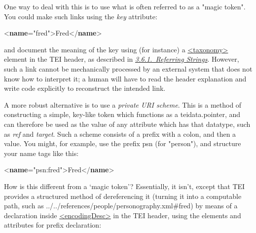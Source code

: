 One way to deal with this is to use what is often referred to as a "magic token". You could make such links using the {\itshape key} attribute: \par\bgroup{}\exampleFont \begin{shaded}\noindent\mbox{}{<\textbf{name}\hspace*{1em}{key}="{fred}">}Fred{</\textbf{name}>}\end{shaded}\egroup\par \noindent  and document the meaning of the key using (for instance) a \hyperref[TEI.taxonomy]{<taxonomy>} element in the TEI header, as described in \textit{\hyperref[CONARS]{3.6.1.\ Referring Strings}}. However, such a link cannot be mechanically processed by an external system that does not know how to interpret it; a human will have to read the header explanation and write code explicitly to reconstruct the intended link.\par
A more robust alternative is to use a \textit{private URI scheme}. This is a method of constructing a simple, key-like token which functions as a \textsf{teidata.pointer}, and can therefore be used as the value of any attribute which has that datatype, such as {\itshape ref} and {\itshape target}. Such a scheme consists of a prefix with a colon, and then a value. You might, for example, use the prefix psn (for "person"), and structure your name tags like this: \par\bgroup{}\exampleFont \begin{shaded}\noindent\mbox{}{<\textbf{name}\hspace*{1em}{ref}="{psn:fred}">}Fred{</\textbf{name}>}\end{shaded}\egroup\par \noindent  How is this different from a ‘magic token’? Essentially, it isn't, except that TEI provides a structured method of dereferencing it (turning it into a computable path, such as ../../references/people/personography.xml\#fred) by means of a declaration inside \hyperref[TEI.encodingDesc]{<encodingDesc>} in the TEI header, using the elements and attributes for prefix declaration: 
